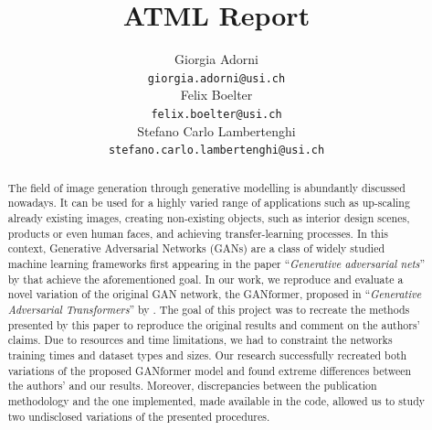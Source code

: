 \documentclass{article}
\title{ATML Report}
\author{%
	Giorgia Adorni \\
	\texttt{giorgia.adorni@usi.ch} \\
	\And
	Felix Boelter\\
	\texttt{felix.boelter@usi.ch}\\
	\And
	Stefano Carlo Lambertenghi\\
	\texttt{stefano.carlo.lambertenghi@usi.ch}\\
}
\begin{document}
	
	\maketitle
	\begin{abstract}
		The field of image generation through generative modelling is abundantly discussed nowadays. It 
		can be used for a highly varied range of applications such as up-scaling 
		already existing images, creating non-existing objects, such as interior design scenes,
		products or even human faces, and achieving transfer-learning processes. 
		In this context, Generative Adversarial Networks (GANs) are a class of widely studied machine 
		learning frameworks first appearing in the paper ``\emph{Generative adversarial nets}'' by 
		\citet{goodfellow2014generative} that achieve the aforementioned goal. 
		In our work, we reproduce and evaluate a novel variation of the original GAN network, the 
		GANformer, proposed in ``\emph{Generative Adversarial Transformers}'' by 
		\citet{hudson2021generative}. 
		The goal of this project was to recreate the methods presented by this paper to reproduce the 
		original results and comment on the authors’ claims. 
		Due to resources and time limitations, we had to constraint the networks training times and 
		dataset types and sizes. 
		Our research successfully recreated both variations of the proposed GANformer model and found 
		extreme differences between the authors’ and our results. 
		Moreover, discrepancies between the publication methodology and the one implemented, 
		made available in the code, allowed us to study two undisclosed variations of the presented 
		procedures.
	\end{abstract}
	
	
\end{document}
